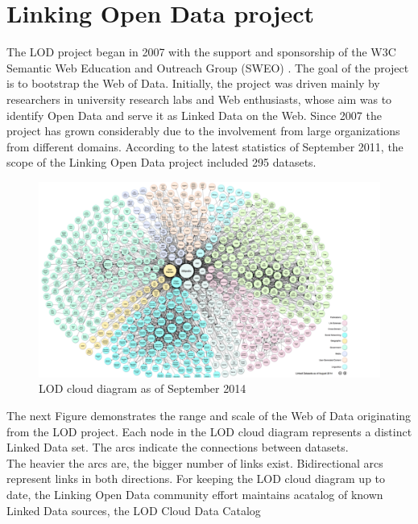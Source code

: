 \documentclass[a4paper,12pt,oneside]{report}
\begin{document}
{{{\section{Linking Open Data project}
{The LOD project began in 2007 with the support and sponsorship of the W3C Semantic Web Education and Outreach Group (SWEO) . The goal of the project is to bootstrap the Web of Data. Initially, the project was driven mainly by researchers
in university research labs and Web enthusiasts, whose aim was to identify Open Data and serve it as Linked Data on the Web. Since 2007 the project has grown considerably due to the involvement from large organizations from different domains. According to the latest statistics of September 2011, the scope of the Linking Open Data project included 295 datasets.\\
\begin{figure}[h!]
\centering
\includegraphics[width=1\textwidth]{Capture6}
\caption{LOD cloud diagram as of September 2014}
\end{figure}
The next Figure demonstrates the range and scale of the Web of Data originating from the LOD project.
Each node in the LOD cloud diagram represents a distinct Linked Data set. The arcs indicate the connections between datasets. \\
The heavier the arcs are, the bigger number of links exist. Bidirectional arcs represent links in both directions. For keeping the
LOD cloud diagram up to date, the Linking Open Data community effort maintains acatalog of known Linked Data sources, the LOD Cloud Data Catalog }
}}}
\end{document}
